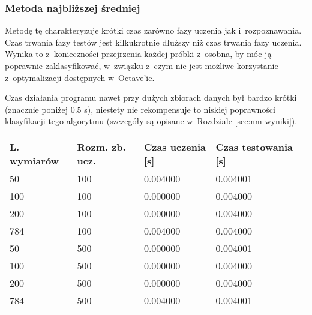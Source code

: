 \documentclass[12pt]{article}
\begin{document}
\subsubsection{Metoda najbliższej średniej}
Metodę tę charakteryzuje krótki czas zarówno fazy uczenia jak i~rozpoznawania. Czas trwania fazy testów jest kilkukrotnie dłuższy niż czas trwania fazy uczenia. Wynika to z~konieczności przejrzenia każdej próbki z~osobna, by móc ją 
poprawnie zaklasyfikować, w~związku z~czym nie jest możliwe korzystanie z~optymalizacji dostępnych w~Octave'ie.

Czas działania programu nawet przy dużych zbiorach danych był bardzo krótki (znacznie poniżej $0.5$ s), niestety nie rekompensuje to niskiej poprawności klasyfikacji tego algorytmu (szczegóły są opisane w~Rozdziale \ref{sec:nm wyniki}).
\begin{table}[H]
\begin{center}
  \begin{tabular}[H]{|l|l|l|l|l|}
  \hline 
  \rowcolor[gray]{0.9} L. wymiarów & Rozm. zb. ucz. & Czas uczenia [s] & Czas testowania [s]  \\ \hline \hline
			  50 &100 & 0.004000 &0.004001\\ \hline 
			  100& 100 & 0.000000& 0.004000\\ \hline 
			  200 &100 & 0.000000& 0.004000 \\ \hline  
			  784 &100 & 0.004000 &0.004000 \\ \hline  
\hline
			  50 &500 & 0.000000 &0.004001\\ \hline  
			  100 &500 & 0.000000& 0.004000 \\ \hline  
			  200 &500 & 0.000000 &0.004000 \\ \hline 
			  784 &500 & 0.004000 &0.004001 \\ \hline 
\hline
			  

\end{tabular}
\end{center}
\end{table}
\end{document}
